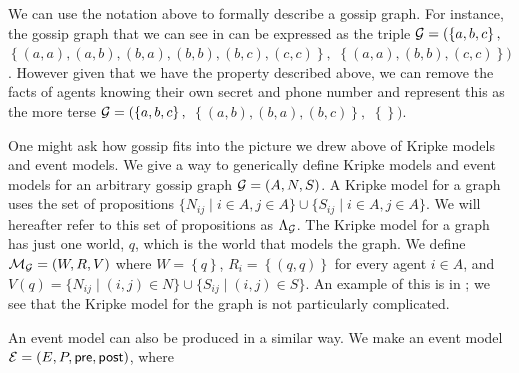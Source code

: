 \documentclass[ %
                    author={Leo Poulson},
                supervisor={Dr. Steven Ramsay},
                    degree={BSc},
                     title={Epistemic Planning for the Dynamic Gossip problem},
                  subtitle={},
                      year={2019} ]{dissertation}
\begin{document}
We can use the notation above to formally describe a gossip graph. For instance,
the gossip graph that we can see in  can be expressed as
the triple $\mathcal{G} = (\left\{ a, b, c \right\},$ $ \left\{ (a, a), (a, b), (b,
  a), (b, b), (b, c), (c, c) \right\},$ $ \left\{ (a, a), (b, b), (c, c)
\right\})$. However given that we have the property described above, we can
remove the facts of agents knowing their own secret and phone number and
represent this as the more terse $\mathcal{G} = (\left\{ a, b, c \right\},$ $ \left\{
  (a, b), (b, a), (b, c) \right\}, $ $ \left\{ \right\})$.

One might ask how gossip fits into the picture we drew above of Kripke models
and event models. We give a way to generically define Kripke models and event
models for an arbitrary gossip graph $\mathcal{G} = (A, N, S)$. A Kripke model for a
graph  uses the set of propositions $\{N_{ij} \mid i \in A, j \in A\}
\cup \{S_{ij} \mid i \in A, j \in A\}$. We will hereafter refer to this set of
propositions as $\Lambda_{\mathcal{G}}$. The Kripke model for a graph  has
just one world, $q$, which is the world that models the graph. We define
$\mathcal{M_G} = (W, R, V)$ where $W = \left\{ q \right\}$, $R_i = \left\{ (q, q)
\right\}$ for every agent $i \in A$, and $V(q) = \{N _{ij} \mid (i, j) \in N\}
\cup \{S_{ij} \mid (i, j) \in S\}$. An example of this is in
; we see that the Kripke model for the graph is not
particularly complicated. 

An event model can also be produced in a similar way. We make an event model
$\mathcal{E} = (E, P, \textsf{pre}, \textsf{post})$, where
\end{document}
